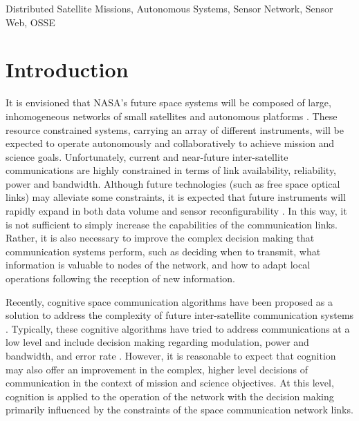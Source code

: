 \documentclass[conference]{IEEEtran}
\begin{document}
\vspace{8pt}

\begin{IEEEkeywords}

  Distributed Satellite Missions, Autonomous Systems, Sensor Network, Sensor Web, OSSE

\end{IEEEkeywords}


\section{Introduction}
\label{sec:intro}

It is envisioned that NASA's future space systems will be composed of large, inhomogeneous networks of small satellites and autonomous platforms \cite{ref1}.  These resource constrained systems, carrying an array of different instruments, will be expected to operate autonomously and collaboratively to achieve mission and science goals.  Unfortunately, current and near-future inter-satellite communications are highly constrained in terms of link availability, reliability, power and bandwidth.  Although future technologies (such as free space optical links) may alleviate some constraints, it is expected that future instruments will rapidly expand in both data volume and sensor reconfigurability \cite{ref2}.  In this way, it is not sufficient to simply increase the capabilities of the communication links.  Rather, it is also necessary to improve the complex decision making that communication systems perform, such as deciding when to transmit, what information is valuable to nodes of the network, and how to adapt local operations following the reception of new information.

Recently, cognitive space communication algorithms have been proposed as a solution to address the complexity of future inter-satellite communication systems \cite{ref3}.  Typically, these cognitive algorithms have tried to address communications at a low level and include decision making regarding modulation, power and bandwidth, and error rate \cite{ref4,ref5}.  However, it is reasonable to expect that cognition may also offer an improvement in the complex, higher level decisions of communication in the context of mission and science objectives.  At this level, cognition is applied to the operation of the network with the decision making primarily influenced by the constraints of the space communication network links.
\end{document}
